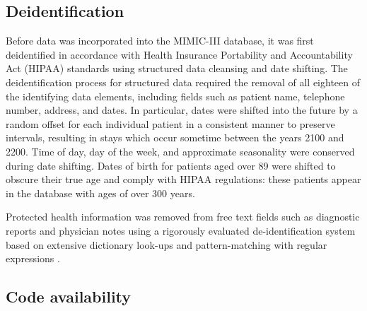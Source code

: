 \documentclass[english]{article}
\begin{document}
\subsection*{Deidentification}

Before data was incorporated into the MIMIC-III database, it was first deidentified in accordance with Health Insurance Portability and Accountability Act (HIPAA) standards using structured data cleansing and date shifting. The deidentification process for structured data required the removal of all eighteen of the identifying data elements, including fields such as patient name, telephone number, address, and dates. In particular, dates were shifted into the future by a random offset for each individual patient in a consistent manner to preserve intervals, resulting in stays which occur sometime between the years 2100 and 2200. Time of day, day of the week, and approximate seasonality were conserved during date shifting. Dates of birth for patients aged over 89 were shifted to obscure their true age and comply with HIPAA regulations: these patients appear in the database with ages of over 300 years. 

Protected health information was removed from free text fields such as diagnostic reports and physician notes using a rigorously evaluated de-identification system based on extensive dictionary look-ups and pattern-matching with regular expressions \cite{cite5}.


\subsection*{Code availability}



\end{document}
